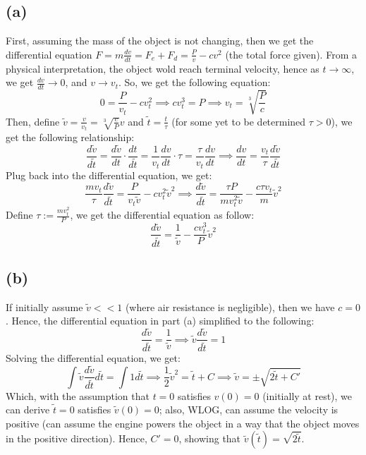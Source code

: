 \documentclass{article}
\begin{document}
\subsection*{(a)}
First, assuming the mass of the object is not changing, then we get the differential equation $F = m\frac{dv}{dt} = F_e + F_d = \frac{P}{v}-cv^2$ (the total force given). From a physical interpretation, the object wold reach terminal velocity, hence as $t\rightarrow\infty$, we get $\frac{dv}{dt}\rightarrow 0$, and $v\rightarrow v_t$. So, we get the following equation:
$$0 = \frac{P}{v_t}-cv_t^2 \implies cv_t^3 = P\implies v_t = \sqrt[3]{\frac{P}{c}}$$
Then, define $\tilde{v}=\frac{v}{v_t} = \sqrt[3]{\frac{c}{P}}v$ and $\tilde{t}=\frac{t}{\tau}$ (for some yet to be determined $\tau>0$), we get the following relationship:
$$\frac{d\tilde{v}}{d\tilde{t}} = \frac{d\tilde{v}}{dt}\cdot \frac{dt}{d\tilde{t}} = \frac{1}{v_t}\frac{dv}{dt}\cdot \tau = \frac{\tau}{v_t}\frac{dv}{dt}\implies \frac{dv}{dt}=\frac{v_t}{\tau}\frac{d\tilde{v}}{d\tilde{t}}$$
Plug back into the differential equation, we get:
$$\frac{mv_t}{\tau}\frac{d\tilde{v}}{d\tilde{t}}=\frac{P}{v_t\tilde{v}}-cv_t^2\tilde{v}^2\implies \frac{d\tilde{v}}{d\tilde{t}} = \frac{\tau P}{mv_t^2\tilde{v}}-\frac{c\tau v_t}{m}\tilde{v}^2$$
Define $\tau := \frac{mv_t^2}{P}$, we get the differential equation as follow:
$$\frac{d\tilde{v}}{d\tilde{t}} = \frac{1}{\tilde{v}}-\frac{cv_t^3}{P}\tilde{v}^2$$

\subsection*{(b)}
If initially assume $\tilde{v}<<1$ (where air resistance is negligible), then we have $c=0$. Hence, the differential equation in part (a) simplified to the following:
$$\frac{d\tilde{v}}{d\tilde{t}}=\frac{1}{\tilde{v}}\implies \tilde{v}\frac{d\tilde{v}}{d\tilde{t}}=1$$
Solving the differential equation, we get:
$$\int \tilde{v}\frac{d\tilde{v}}{d\tilde{t}}d\tilde{t} = \int 1d\tilde{t}\implies \frac{1}{2}\tilde{v}^2=\tilde{t}+C\implies \tilde{v} = \pm\sqrt{2\tilde{t}+C'}$$
Which, with the assumption that $t=0$ satisfies $v(0) = 0$ (initially at rest), we can derive $\tilde{t}=0$ satisfies $\tilde{v}(0) = 0$; also, WLOG, can assume the velocity is positive (can assume the engine powers the object in a way that the object moves in the positive direction). Hence, $C' = 0$, showing that $\tilde{v}(\tilde{t})=\sqrt{2\tilde{t}}$.
\end{document}

